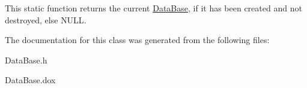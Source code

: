 This static function returns the current \mbox{\hyperlink{classHurricane_1_1DataBase}{Data\+Base}}, if it has been created and not destroyed, else {\ttfamily N\+U\+LL}. 

The documentation for this class was generated from the following files\+:\begin{DoxyCompactItemize}
\item 
Data\+Base.\+h\item 
Data\+Base.\+dox\end{DoxyCompactItemize}
